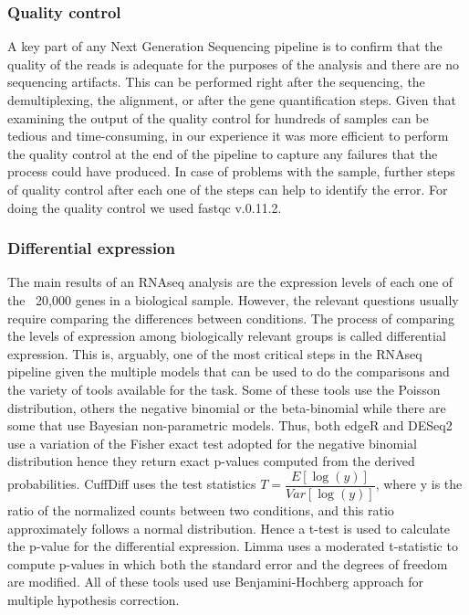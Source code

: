 \subsubsection{Quality control}
A key part of any Next Generation Sequencing pipeline is to confirm that the quality of the reads is adequate for the purposes of the analysis and there are no sequencing artifacts. This can be performed right after the sequencing, the demultiplexing, the alignment, or after the gene quantification steps. Given that examining the output of the quality control for hundreds of samples can be tedious and time-consuming, in our experience it was more efficient to perform the quality control at the end of the pipeline to capture any failures that the process could have produced. In case of problems with the sample, further steps of quality control after each one of the steps can help to identify the error. For doing the quality control we used fastqc v.0.11.2.

\subsubsection{Differential expression}
The main results of an RNAseq analysis are the expression levels of each one of the ~20,000 genes in a biological sample. However, the relevant questions usually require comparing the differences between conditions. The process of comparing the levels of expression among biologically relevant groups is called differential expression. This is, arguably, one of the most critical steps in the RNAseq pipeline given the multiple models that can be used to do the comparisons and the variety of tools available for the task. Some of these tools use the Poisson distribution, others the negative binomial or the beta-binomial while there are some that use Bayesian non-parametric models. Thus, both edgeR and DESeq2 use a variation of the Fisher exact test adopted for the negative binomial distribution hence they return exact p-values computed from the derived probabilities. CuffDiff uses the test statistics $T=\dfrac{E[\log(y)]}{Var[\log(y)]}$, where y is the ratio of the normalized counts between two conditions, and this ratio approximately follows a normal distribution. Hence a t-test is used to calculate the p-value for the differential expression. Limma uses a moderated t-statistic to compute p-values in which both the standard error and the degrees of freedom are modified. All of these tools used use Benjamini-Hochberg approach for multiple hypothesis correction.

